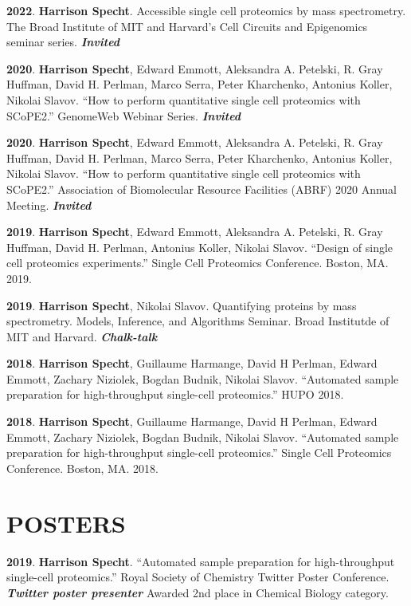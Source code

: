 \documentclass[11pt,]{article}
\begin{document}
\textbf{2022}. \textbf{Harrison Specht}. Accessible single cell
proteomics by mass spectrometry. The Broad Institute of MIT and
Harvard's Cell Circuits and Epigenomics seminar series.
\emph{\textbf{Invited}}

\textbf{2020}. \textbf{Harrison Specht}, Edward Emmott, Aleksandra A.
Petelski, R. Gray Huffman, David H. Perlman, Marco Serra, Peter
Kharchenko, Antonius Koller, Nikolai Slavov. ``How to perform
quantitative single cell proteomics with SCoPE2.'' GenomeWeb Webinar
Series. \emph{\textbf{Invited}}

\textbf{2020}. \textbf{Harrison Specht}, Edward Emmott, Aleksandra A.
Petelski, R. Gray Huffman, David H. Perlman, Marco Serra, Peter
Kharchenko, Antonius Koller, Nikolai Slavov. ``How to perform
quantitative single cell proteomics with SCoPE2.'' Association of
Biomolecular Resource Facilities (ABRF) 2020 Annual Meeting.
\emph{\textbf{Invited}}

\textbf{2019}. \textbf{Harrison Specht}, Edward Emmott, Aleksandra A.
Petelski, R. Gray Huffman, David H. Perlman, Antonius Koller, Nikolai
Slavov. ``Design of single cell proteomics experiments.'' Single Cell
Proteomics Conference. Boston, MA. 2019.

\textbf{2019}. \textbf{Harrison Specht}, Nikolai Slavov. Quantifying
proteins by mass spectrometry. Models, Inference, and Algorithms
Seminar. Broad Institutde of MIT and Harvard. \emph{\textbf{Chalk-talk}}

\textbf{2018}. \textbf{Harrison Specht}, Guillaume Harmange, David H
Perlman, Edward Emmott, Zachary Niziolek, Bogdan Budnik, Nikolai Slavov.
``Automated sample preparation for high-throughput single-cell
proteomics.'' HUPO 2018.

\textbf{2018}. \textbf{Harrison Specht}, Guillaume Harmange, David H
Perlman, Edward Emmott, Zachary Niziolek, Bogdan Budnik, Nikolai Slavov.
``Automated sample preparation for high-throughput single-cell
proteomics.'' Single Cell Proteomics Conference. Boston, MA. 2018.

\hypertarget{posters}{%
\section{POSTERS}\label{posters}}

\textbf{2019}. \textbf{Harrison Specht}. ``Automated sample preparation
for high-throughput single-cell proteomics.'' Royal Society of Chemistry
Twitter Poster Conference. \emph{\textbf{Twitter poster presenter}}
Awarded 2nd place in Chemical Biology category.
\end{document}
